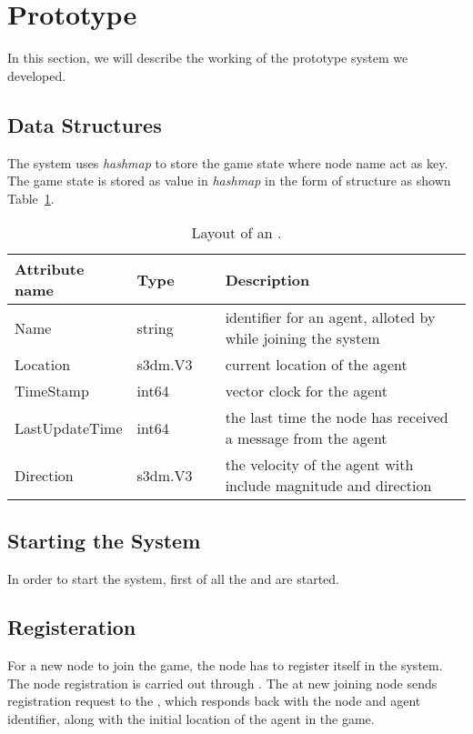 \section{Prototype}
\label{sec:prototype}

	In this section, we will describe the working of the prototype system we developed.
\subsection{Data Structures}
	The system uses \emph{hashmap} to store the game state where node name act as key. The game state is stored as value in \emph{hashmap} in the form of structure as shown Table~\ref{table:gamestate-struct}.


\begin{table}[htb]
	\centering
	\begin{tabular}{p{0.2\linewidth} | p{0.2\linewidth} | p{0.6\linewidth}}
		\textbf{Attribute name} & \textbf{Type} & \textbf{Description} \\ \hline
		Name & string & identifier for an agent, alloted by \activityServer while joining the system \\ \hline
		Location & s3dm.V3 & current location of the agent \\ \hline
		TimeStamp & int64  & vector clock for the agent \\  \hline
		LastUpdateTime & int64 & the last time the node has received a message from the agent\\ \hline
		Direction & s3dm.V3 & the velocity of the agent with include magnitude and direction \\ \hline	
	\end{tabular}
	\caption{\label{table:gamestate-struct} Layout of an \agentstate.}
\end{table}


\subsection{Starting the System}
	In order to start the system, first of all the \kvService and \activityServer are started.
	
\subsection{Registeration}
	For a  new node to join the game, the node has to register itself in the system. The node registration is carried out through \activityServer. The \localServer at new joining node sends registration request to the \activityServer, which responds back with the node and agent identifier, along with the initial location of the agent in the game.

